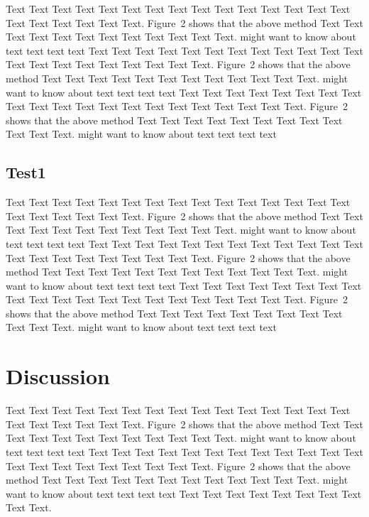 \documentclass{bioinfo}
\begin{document}
Text Text Text Text Text Text  Text Text Text Text Text Text Text
Text Text  Text Text Text Text Text Text.
Figure~2\vphantom{\ref{fig:02}} shows that the above method  Text
Text Text Text  Text Text Text Text Text Text  Text Text.
\citealp{Boffelli03} might want to know about  text text text text
Text Text Text Text Text Text  Text Text Text Text Text Text Text
Text Text  Text Text Text Text Text Text.
Figure~2\vphantom{\ref{fig:02}} shows that the above method  Text
Text Text Text  Text Text Text Text Text Text  Text Text.
\citealp{Boffelli03} might want to know about  text text text text
Text Text Text Text Text Text Text Text Text Text Text Text Text
Text Text  Text Text Text Text Text Text.
Figure~2\vphantom{\ref{fig:02}} shows that the above method  Text
Text Text Text  Text Text Text Text Text Text  Text Text.
\citealp{Boffelli03} might want to know about  text text text text


\subsection{Test1}

Text Text Text Text Text Text  Text Text Text Text Text Text Text
Text Text  Text Text Text Text Text Text.
Figure~2\vphantom{\ref{fig:02}} shows that the above method  Text
Text Text Text  Text Text Text Text Text Text  Text Text.
\citealp{Boffelli03} might want to know about  text text text text
Text Text Text Text Text Text  Text Text Text Text Text Text Text
Text Text  Text Text Text Text Text Text.
Figure~2\vphantom{\ref{fig:02}} shows that the above method  Text
Text Text Text  Text Text Text Text Text Text  Text Text.
\citealp{Boffelli03} might want to know about  text text text text
Text Text Text Text Text Text Text Text Text Text Text Text Text
Text Text  Text Text Text Text Text Text.
Figure~2\vphantom{\ref{fig:02}} shows that the above method  Text
Text Text Text  Text Text Text Text Text Text  Text Text.
\citealp{Boffelli03} might want to know about  text text text text





\section{Discussion}

Text Text Text Text Text Text  Text Text Text Text Text Text Text
Text Text  Text Text Text Text Text Text.
Figure~2\vphantom{\ref{fig:02}} shows that the above method  Text
Text Text Text  Text Text Text Text Text Text  Text Text.
\citealp{Boffelli03} might want to know about  text text text text
Text Text Text Text Text Text  Text Text Text Text Text Text Text
Text Text  Text Text Text Text Text Text.
Figure~2\vphantom{\ref{fig:02}} shows that the above method  Text
Text Text Text  Text Text Text Text Text Text  Text Text.
\citealp{Boffelli03} might want to know about  text text text text
Text Text Text Text Text Text Text Text Text Text.
\end{document}
